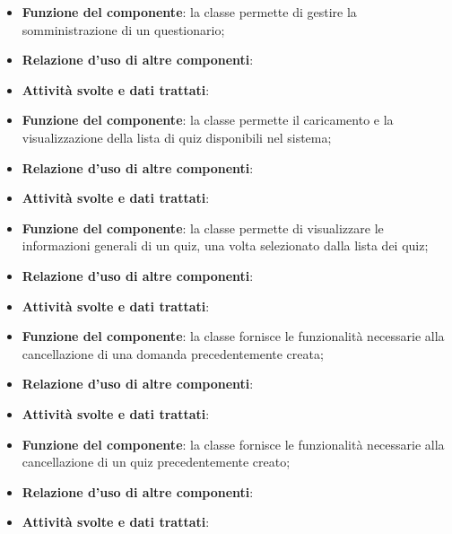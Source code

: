 
\begin{itemize}
	\item\textbf{Funzione del componente}: la classe permette di gestire la somministrazione di un questionario;
	\item\textbf{Relazione d'uso di altre componenti}: 
	\item\textbf{Attività svolte e dati trattati}: 
\end{itemize}


\begin{itemize}
	\item\textbf{Funzione del componente}:  la classe permette il caricamento e la visualizzazione della lista di quiz disponibili nel sistema;
	\item\textbf{Relazione d'uso di altre componenti}: 
	\item\textbf{Attività svolte e dati trattati}:
\end{itemize}


\begin{itemize}
	\item\textbf{Funzione del componente}: la classe permette di visualizzare le informazioni generali di un quiz, una volta selezionato dalla lista dei quiz;
	\item\textbf{Relazione d'uso di altre componenti}: 
	\item\textbf{Attività svolte e dati trattati}:
\end{itemize}


\begin{itemize}
	\item\textbf{Funzione del componente}: la classe fornisce le funzionalità necessarie alla cancellazione di una domanda precedentemente creata;
	\item\textbf{Relazione d'uso di altre componenti}: 
	\item\textbf{Attività svolte e dati trattati}:
\end{itemize}


\begin{itemize}
	\item\textbf{Funzione del componente}: la classe fornisce le funzionalità necessarie alla cancellazione di un quiz precedentemente creato;
	\item\textbf{Relazione d'uso di altre componenti}: 
	\item\textbf{Attività svolte e dati trattati}:
\end{itemize}

